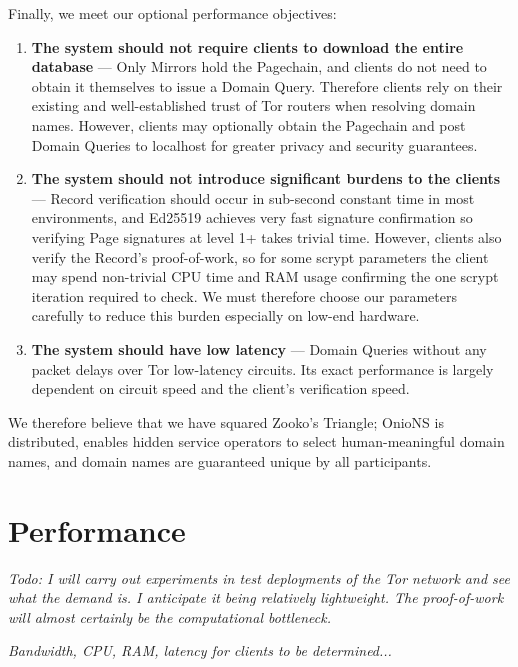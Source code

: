 Finally, we meet our optional performance objectives:

\begin{enumerate}
	\item \textbf{The system should not require clients to download the entire database} --- Only Mirrors hold the Pagechain, and clients do not need to obtain it themselves to issue a Domain Query. Therefore clients rely on their existing and well-established trust of Tor routers when resolving domain names. However, clients may optionally obtain the Pagechain and post Domain Queries to localhost for greater privacy and security guarantees.
	\item \textbf{The system should not introduce significant burdens to the clients} --- Record verification should occur in sub-second constant time in most environments, and Ed25519 achieves very fast signature confirmation so verifying Page signatures at level 1+ takes trivial time. However, clients also verify the Record's proof-of-work, so for some scrypt parameters the client may spend non-trivial CPU time and RAM usage confirming the one scrypt iteration required to check. We must therefore choose our parameters carefully to reduce this burden especially on low-end hardware.
	\item \textbf{The system should have low latency} --- Domain Queries without any packet delays over Tor low-latency circuits. Its exact performance is largely dependent on circuit speed and the client's verification speed.
\end{enumerate}

We therefore believe that we have squared Zooko's Triangle; OnioNS is distributed, enables hidden service operators to select human-meaningful domain names, and domain names are guaranteed unique by all participants.


\section{Performance}

\emph{Todo: I will carry out experiments in test deployments of the Tor network and see what the demand is. I anticipate it being relatively lightweight. The proof-of-work will almost certainly be the computational bottleneck.}

\emph{Bandwidth, CPU, RAM, latency for clients to be determined...}



